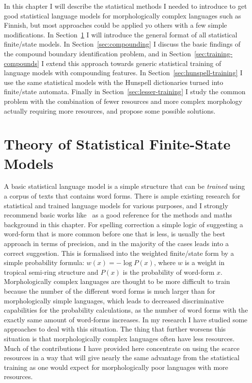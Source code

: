 \documentclass[officiallayout]{unihelcompling}
\begin{document}
In this chapter I will describe the statistical methods I needed to introduce
to get good statistical language models for morphologically complex languages
such as Finnish, but most approaches could be applied yo others with a
few simple modifications. In Section~\ref{sec:statistical} I will introduce the
general format of all statistical finite\-/state models.  In
Section~\ref{sec:compounding} I discuss the basic findings of the compound boundary
identification problem, and in Section~\ref{sec:training-compounds} I extend
this approach towards generic statistical training of language models with
compounding features. In Section~\ref{sec:hunspell-training} I use the same
statistical models with the Hunspell dictionaries turned into finite\-/state
automata. Finally in Section~\ref{sec:lesser-training} I study the common
problem with the combination of fewer resources and more complex morphology
actually requiring more resources, and propose some possible solutions.

\section{Theory of Statistical Finite-State Models}
\label{sec:statistical}

A basic statistical language model is a simple structure that can be
\emph{trained} using a corpus of texts that contains word forms. There is ample
existing research for statistical and trained language models for various
purposes, and I strongly recommend basic works
like~\citet{manning1999foundations} as a good reference for the methods and
maths background in this chapter.  For spelling correction a simple logic of
suggesting a word-form that is more common before one that is less, is usually
the best approach in terms of precision, and in the majority of the cases leads
into a correct suggestion. This is formalised into the weighted finite\-/state
form by a simple probability formula: $w(x) = -\log P(x)$, where $w$ is a
weight in tropical semi-ring structure and $P(x)$ is the probability of
word-form $x$.  Morphologically complex languages are thought to be more
difficult to train because the number of the different word forms is much
larger than for morphologically simple languages, which leads to decreased
discriminative capabilities for the probability calculations, as the number of
word forms with the exactly same amount of word-forms increases. In my research
I have studied some approaches to deal with this situation. The thing that
further worsens this situation is that morphologically complex languages often
have less resources.  Much of the contributions I have provided here
concentrate on using the scarce resources in a way that will give nearly the
same advantage from the statistical training as one would expect for
morphologically poor languages with more resources.
\end{document}
